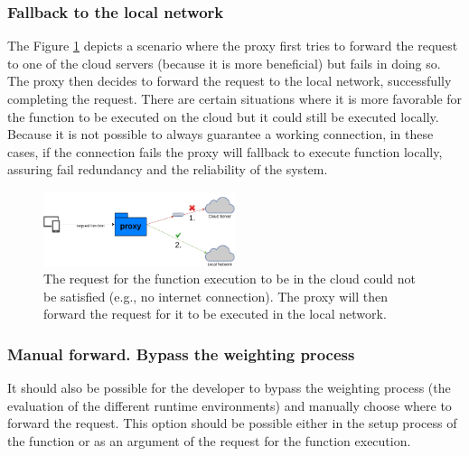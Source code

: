 \documentclass[conference]{IEEEtran}
\begin{document}
\subsubsection{Fallback to the local network}
\label{usecases:fallback}

The Figure \ref{fig:fallback-local} depicts a scenario where the proxy first tries
to forward the request to one of the cloud servers (because it is more beneficial)
but fails in doing so. The proxy then decides to forward the request to the local
network, successfully completing the request. There are certain situations where
it is more favorable for the function to be executed on the cloud but it could
still be executed locally. Because it is not possible to always guarantee a
working connection, in these cases, if the connection fails the proxy will
fallback to execute function locally, assuring fail redundancy and the reliability
of the system.

\begin{figure}[ht]
  \begin{center}
    \includegraphics[width=0.5\textwidth]{diss-fallback-local.png}
    \caption{The request for the function execution to be in the cloud could not be satisfied (e.g., no internet connection). The proxy will then forward the
request for it to be executed in the local network.}
    \label{fig:fallback-local}
  \end{center}
\end{figure}

\subsubsection{Manual forward. Bypass the weighting process}
\label{usecases:manual_forward}

It should also be possible for the developer to bypass the weighting process (the
evaluation of the different runtime environments) and manually choose where to forward the
request. This option should be possible either in the setup process of the
function or as an argument of the request for the function execution. 
\end{document}
